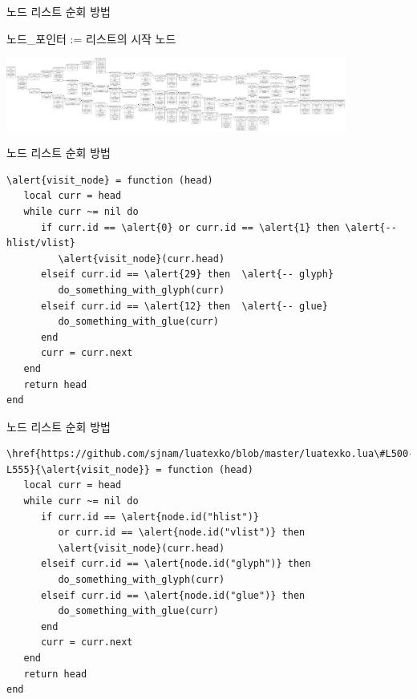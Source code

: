 \documentclass[t,10pt]{beamer}
\begin{document}
\begin{frame}[fragile]{노드 리스트 순회 방법}
  \begin{algorithm}[H]
    \SetAlgoNoLine
    노드\_포인터 := 리스트의 시작 노드\;
  \end{algorithm}

  \hskip-2mm
  \href{run:images/nodelist.pdf}{\includegraphics[width=4.4in]{nodelist.pdf}}
\end{frame}

\begin{frame}[fragile]{노드 리스트 순회 방법}
  \begin{Verbatim}[fontsize=\small,commandchars=\\\{\}]
\alert{visit_node} = function (head)
   local curr = head
   while curr ~= nil do
      if curr.id == \alert{0} or curr.id == \alert{1} then \alert{-- hlist/vlist}
         \alert{visit_node}(curr.head)
      elseif curr.id == \alert{29} then  \alert{-- glyph}
         do_something_with_glyph(curr)
      elseif curr.id == \alert{12} then  \alert{-- glue}
         do_something_with_glue(curr)
      end
      curr = curr.next
   end
   return head
end
  \end{Verbatim}
\end{frame}

\begin{frame}[fragile]{노드 리스트 순회 방법}
  \begin{Verbatim}[fontsize=\small,commandchars=\\\{\}]
\href{https://github.com/sjnam/luatexko/blob/master/luatexko.lua\#L500-L555}{\alert{visit_node}} = function (head)
   local curr = head
   while curr ~= nil do
      if curr.id == \alert{node.id("hlist")}
         or curr.id == \alert{node.id("vlist")} then
         \alert{visit_node}(curr.head)
      elseif curr.id == \alert{node.id("glyph")} then
         do_something_with_glyph(curr)
      elseif curr.id == \alert{node.id("glue")} then
         do_something_with_glue(curr)
      end
      curr = curr.next
   end
   return head
end
  \end{Verbatim}
\end{frame}
\end{document}
